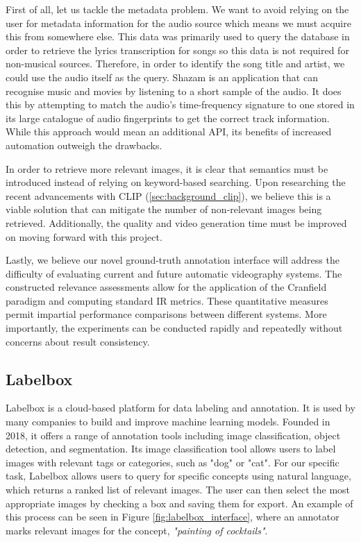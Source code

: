 \documentclass{l4proj}
\begin{document}
First of all, let us tackle the metadata problem. We want to avoid relying on the user for metadata information for the audio source which means we must acquire this from somewhere else. This data was primarily used to query the \cite{genius} database in order to retrieve the lyrics transcription for songs so this data is not required for non-musical sources. Therefore, in order to identify the song title and artist, we could use the audio itself as the query. Shazam \citep{wang2006shazam} is an application that can recognise music and movies by listening to a short sample of the audio. It does this by attempting to match the audio's time-frequency signature to one stored in its large catalogue of audio fingerprints to get the correct track information. While this approach would mean an additional API, its benefits of increased automation outweigh the drawbacks.

In order to retrieve more relevant images, it is clear that semantics must be introduced instead of relying on keyword-based searching. Upon researching the recent advancements with CLIP (\ref{sec:background_clip}), we believe this is a viable solution that can mitigate the number of non-relevant images being retrieved. Additionally, the quality and video generation time must be improved on moving forward with this project.

Lastly, we believe our novel ground-truth annotation interface will address the difficulty of evaluating current and future automatic videography systems. The constructed relevance assessments allow for the application of the Cranfield paradigm and computing standard IR metrics. These quantitative measures permit impartial performance comparisons between different systems. More importantly, the experiments can be conducted rapidly and repeatedly without concerns about result consistency.


\subsection{Labelbox}
\label{sec:labelbox}
Labelbox is a cloud-based platform for data labeling and annotation. It is used by many companies to build and improve machine learning models. Founded in 2018, it offers a range of annotation tools including image classification, object detection, and segmentation. Its image classification tool allows users to label images with relevant tags or categories, such as "dog" or "cat". For our specific task, Labelbox allows users to query for specific concepts using natural language, which returns a ranked list of relevant images. The user can then select the most appropriate images by checking a box and saving them for export. An example of this process can be seen in Figure \ref{fig:labelbox_interface}, where an annotator marks relevant images for the concept, \emph{"painting of cocktails"}.
\end{document}
